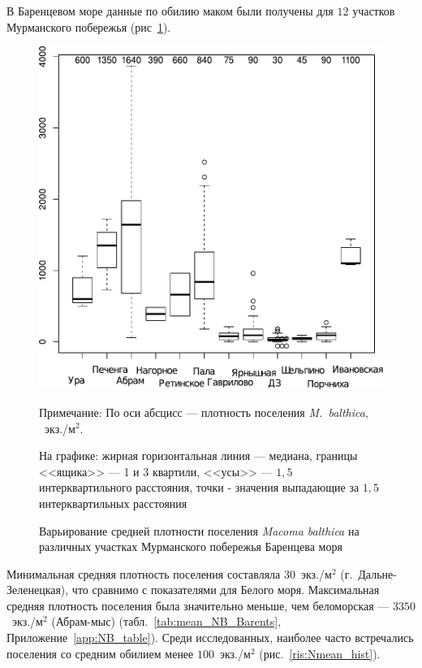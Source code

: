 В Баренцевом море данные по обилию маком были получены для $12$ участков Мурманского побережья (рис~\ref{ris:N_area_Barents}).
	\begin{figure}[p]
	\begin{center}
		\includegraphics[height=0.5\textheight]{../All_N/N2_area_Barents1.pdf}
	\end{center}
	\caption{Варьирование средней плотности поселения {\it Macoma balthica} на различных участках Мурманского побережья Баренцева моря}
	{\footnotesize Примечание: По оси абсцисс --- плотность поселения {\it M.~balthica}, ~экз./м$^2$.

	На графике: жирная горизонтальная линия --- медиана, границы <<ящика>> --- 1 и 3 квартили, <<усы>> --- $1,5$ интерквартильного расстояния, точки - значения выпадающие за $1,5$ интерквартильных расстояния}
	\label{ris:N_area_Barents}
	\end{figure}
Минимальная средняя плотность поселения составляла $30$~экз./м$^2$ (г.~Дальне-Зеленецкая), что сравнимо с показателями для Белого моря. 
Максимальная средняя плотность поселения была значительно меньше, чем беломорская --- $3350$~экз./м$^2$ (Абрам-мыс) (табл.~\ref{tab:mean_NB_Barents}, Приложение~\ref{app:NB_table}). 
Среди исследованных, наиболее часто встречались поселения со средним обилием менее $100$~экз./м$^2$ (рис.~\ref{ris:Nmean_hist}).

